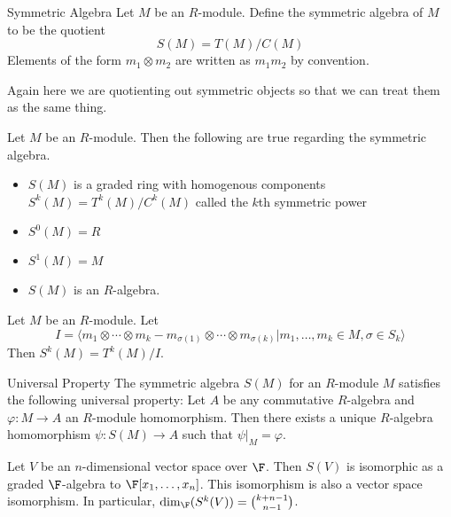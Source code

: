 \documentclass[a4paper]{article}
\begin{document}
\begin{defn}{Symmetric Algebra}{} Let $M$ be an $R$-module. Define the symmetric algebra of $M$ to be the quotient $$S(M)=T(M)/C(M)$$ Elements of the form $m_1\otimes m_2$ are written as $m_1m_2$ by convention. 
\end{defn}

Again here we are quotienting out symmetric objects so that we can treat them as the same thing. 

\begin{prp}{}{} Let $M$ be an $R$-module. Then the following are true regarding the symmetric algebra. 
\begin{itemize}
\item $S(M)$ is a graded ring with homogenous components $S^k(M)=T^k(M)/C^k(M)$ called the $k$th symmetric power
\item $S^0(M)=R$
\item $S^1(M)=M$
\item $S(M)$ is an $R$-algebra. 
\end{itemize}
\end{prp}

\begin{thm}{}{} Let $M$ be an $R$-module. Let $$I=\langle m_1\otimes\cdots\otimes m_k-m_{\sigma(1)}\otimes\cdots\otimes m_{\sigma(k)}|m_1,\dots,m_k\in M, \sigma\in S_k\rangle$$ Then $S^k(M)=T^k(M)/I$. 
\end{thm}

\begin{thm}{Universal Property}{} The symmetric algebra $S(M)$ for an $R$-module $M$ satisfies the following universal property: Let $A$ be any commutative $R$-algebra and $\varphi:M\to A$ an $R$-module homomorphism. Then there exists a unique $R$-algebra homomorphism $\psi:S(M)\to A$ such that $\psi|_M=\varphi$. 
\end{thm}

\begin{crl}{}{} Let $V$ be an $n$-dimensional vector space over $\F$. Then $S(V)$ is isomorphic as a graded $\F$-algebra to $\F[x_1,\dots,x_n]$. This isomorphism is also a vector space isomorphism. In particular, $\dim_\F(S^k(V))=\binom{k+n-1}{n-1}$. 
\end{crl}
\end{document}
